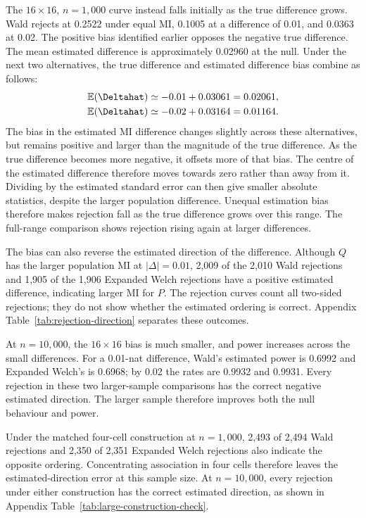 The \(16\times16\), \(n=1{,}000\) curve instead falls initially as
the true difference grows. Wald rejects at 0.2522 under equal MI,
0.1005 at a difference of 0.01, and 0.0363 at 0.02. The positive bias
identified earlier opposes the negative true difference. The mean
estimated difference is approximately 0.02960 at the null. Under the
next two alternatives, the true difference and estimated difference
bias combine as follows:
\begin{align}
 \mathbb{E}(\Deltahat)&\simeq-0.01+0.03061=0.02061,\\
 \mathbb{E}(\Deltahat)&\simeq-0.02+0.03164=0.01164.
 \label{eq:focused-detection-bias-shift}
\end{align}
The bias in the estimated MI difference changes slightly across these
alternatives, but remains
positive and larger than the magnitude of the true difference. As the
true difference becomes more negative, it offsets more of that bias.
The centre of the estimated difference therefore moves towards zero
rather than away from it. Dividing by the estimated standard error
can then give smaller absolute statistics, despite the larger population
difference. Unequal estimation bias therefore makes rejection fall as
the true difference grows over this range. The full-range comparison
shows rejection rising again at larger differences.

The bias can also reverse the estimated direction of the difference.
Although \(Q\) has the larger population MI at \(|\Delta|=0.01\),
2,009 of the 2,010 Wald rejections and 1,905 of the 1,906 Expanded
Welch rejections have a positive estimated difference, indicating larger
MI for \(P\). The rejection curves count all two-sided rejections;
they do not show whether the estimated ordering is correct.
Appendix Table~\ref{tab:rejection-direction} separates these outcomes.

At \(n=10{,}000\), the \(16\times16\) bias is much smaller, and
power increases across the small differences. For a 0.01-nat difference,
Wald's estimated power is 0.6992 and Expanded Welch's is 0.6968; by 0.02
the rates are 0.9932 and 0.9931. Every rejection in these two larger-sample
comparisons has the correct negative estimated direction. The larger
sample therefore improves both the null behaviour and power.

Under the matched four-cell construction at \(n=1{,}000\),
2,493 of 2,494 Wald rejections and 2,350 of 2,351 Expanded Welch rejections
also indicate the opposite ordering. Concentrating association in four
cells therefore leaves the estimated-direction error at this sample size.
At \(n=10{,}000\), every rejection under either construction has the
correct estimated direction, as shown in Appendix
Table~\ref{tab:large-construction-check}.

